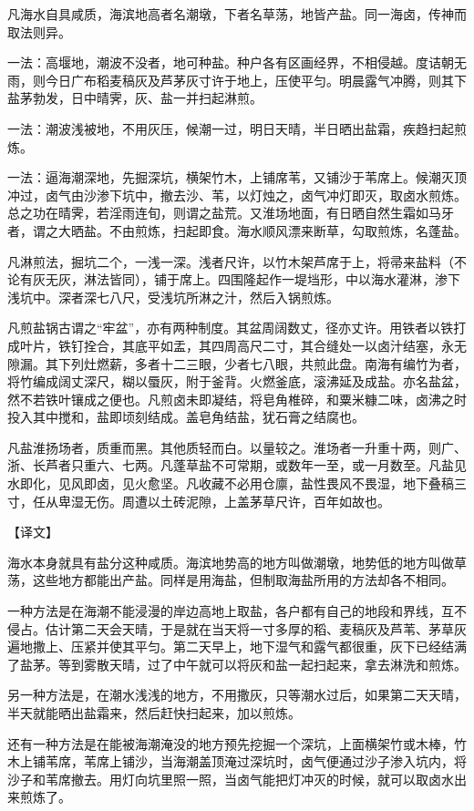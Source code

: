 \documentclass[12pt,UTF8]{ctexbook}
\begin{document}
凡海水自具咸质，海滨地高者名潮墩，下者名草荡，地皆产盐。同一海卤，传神而取法则异。

一法：高堰地，潮波不没者，地可种盐。种户各有区画经界，不相侵越。度诘朝无雨，则今日广布稻麦稿灰及芦茅灰寸许于地上，压使平匀。明晨露气冲腾，则其下盐茅勃发，日中晴霁，灰、盐一并扫起淋煎。

一法：潮波浅被地，不用灰压，候潮一过，明日天晴，半日晒出盐霜，疾趋扫起煎炼。

一法：逼海潮深地，先掘深坑，横架竹木，上铺席苇，又铺沙于苇席上。候潮灭顶冲过，卤气由沙渗下坑中，撤去沙、苇，以灯烛之，卤气冲灯即灭，取卤水煎炼。总之功在晴霁，若淫雨连旬，则谓之盐荒。又淮场地面，有日晒自然生霜如马牙者，谓之大晒盐。不由煎炼，扫起即食。海水顺风漂来断草，勾取煎炼，名蓬盐。

凡淋煎法，掘坑二个，一浅一深。浅者尺许，以竹木架芦席于上，将帚来盐料（不论有灰无灰，淋法皆同），铺于席上。四围隆起作一堤垱形，中以海水灌淋，渗下浅坑中。深者深七八尺，受浅坑所淋之汁，然后入锅煎炼。

凡煎盐锅古谓之“牢盆”，亦有两种制度。其盆周阔数丈，径亦丈许。用铁者以铁打成叶片，铁钉拴合，其底平如盂，其四周高尺二寸，其合缝处一以卤汁结塞，永无隙漏。其下列灶燃薪，多者十二三眼，少者七八眼，共煎此盘。南海有编竹为者，将竹编成阔丈深尺，糊以蜃灰，附于釜背。火燃釜底，滚沸延及成盐。亦名盐盆，然不若铁叶镶成之便也。凡煎卤未即凝结，将皂角椎碎，和粟米糠二味，卤沸之时投入其中搅和，盐即顷刻结成。盖皂角结盐，犹石膏之结腐也。

凡盐淮扬场者，质重而黑。其他质轻而白。以量较之。淮场者一升重十两，则广、浙、长芦者只重六、七两。凡蓬草盐不可常期，或数年一至，或一月数至。凡盐见水即化，见风即卤，见火愈坚。凡收藏不必用仓廪，盐性畏风不畏湿，地下叠稿三寸，任从卑湿无伤。周遭以土砖泥隙，上盖茅草尺许，百年如故也。

【译文】

海水本身就具有盐分这种咸质。海滨地势高的地方叫做潮墩，地势低的地方叫做草荡，这些地方都能出产盐。同样是用海盐，但制取海盐所用的方法却各不相同。

一种方法是在海潮不能浸漫的岸边高地上取盐，各户都有自己的地段和界线，互不侵占。估计第二天会天晴，于是就在当天将一寸多厚的稻、麦稿灰及芦苇、茅草灰遍地撒上、压紧并使其平匀。第二天早上，地下湿气和露气都很重，灰下已经结满了盐茅。等到雾散天晴，过了中午就可以将灰和盐一起扫起来，拿去淋洗和煎炼。

另一种方法是，在潮水浅浅的地方，不用撒灰，只等潮水过后，如果第二天天晴，半天就能晒出盐霜来，然后赶快扫起来，加以煎炼。

还有一种方法是在能被海潮淹没的地方预先挖掘一个深坑，上面横架竹或木棒，竹木上铺苇席，苇席上铺沙，当海潮盖顶淹过深坑时，卤气便通过沙子渗入坑内，将沙子和苇席撤去。用灯向坑里照一照，当卤气能把灯冲灭的时候，就可以取卤水出来煎炼了。
\end{document}
